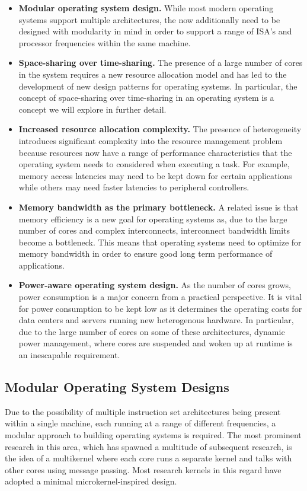 \begin{itemize}
\item \textbf{Modular operating system design.} While most modern operating systems support multiple architectures, the now
additionally need to be designed with modularity in mind in order to support a range
of ISA's and processor frequencies within the same machine.
\item \textbf{Space-sharing over time-sharing.} The presence of a large number of cores in the system requires a new resource allocation model and has led to the development
of new design patterns for operating systems. In particular, the concept of space-sharing over time-sharing in an operating system is a concept we will explore in further detail.
\item \textbf{Increased resource allocation complexity.} The presence of heterogeneity introduces significant complexity into the resource
management problem because resources now have a range of performance characteristics
that the operating system needs to considered when executing a task. For example, memory access latencies may need to be kept down for certain applications while others may need faster latencies to peripheral controllers.
\item \textbf{Memory bandwidth as the primary bottleneck.} A related issue is that memory efficiency is a new goal for operating systems as, due to the large number of cores and complex interconnects, interconnect bandwidth limits become a bottleneck. This means that operating systems need to optimize for memory bandwidth in order to ensure good long term performance of applications.
\item \textbf{Power-aware operating system design.} As the number of cores grows, power consumption is a major concern from a practical perspective. It is vital for power consumption to be kept low as it determines the operating costs for data centers and servers running new heterogenous hardware. In particular, due to the large number of cores on some of these architectures, dynamic power management, where cores are suspended and woken up at runtime is an inescapable requirement.
\end{itemize}

\subsection{Modular Operating System Designs}

Due to the possibility of multiple instruction set architectures being present within a
single machine, each running at a range of different frequencies, a modular approach to building operating systems is required. The most prominent research in this area, which has spawned a multitude of subsequent research, is the idea of a multikernel \cite{Barrelfish} where each core runs a separate kernel and talks with other cores using message passing. Most research kernels in this regard have adopted a minimal microkernel-inspired design.

